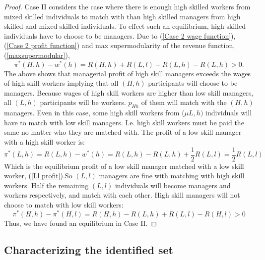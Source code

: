 \documentclass[12 pt]{article}
\begin{document}
\begin{proof}
	Case II considers the case where there is enough high skilled workers from
	mixed skilled individuals to match with than high skilled managers from high
	skilled and mixed skilled individuals. To effect such an equilibrium, high
	skilled individuals have to choose to be managers. Due to
	(\ref{Case 2 wage function}), (\ref{Case 2 profit function}) and max
	supermodularity of the revenue function, (\ref{maxsupermodular}),
	\[
	\pi^{\ast}(H,h)-w^{\ast}(h)=R(H,h)+R(L,l)-R(L,h)-R(L,h)>0.
	\]
	The above shows that managerial profit of high skill managers exceeds the
	wages of high skill workers implying that all $(H,h)$ participants will choose
	to be managers.	Because wages of high skill workers are higher than low skill managers, all $(L,h)$ participants will be workers. $p_{Hh}$ of them will match with the $(H,h)$ managers. Even in this case, some
	high skill workers from ($\mu L,h)$ individuals will have to match with low
	skill managers. I.e. high skill workers must be paid the same no matter who
	they are matched with. The profit of a low skill manager with a high skill
	worker is:%
	\begin{equation}
		\pi^{\ast}(L,h)=R(L,h)-w^{\ast}(h)=R(L,h)-R(L,h)+\frac{1}{2}R(L,l)=\frac{1}%
		{2}R(L,l)\label{Lh profits}%
	\end{equation}
	Which is the equilibrium profit of a low skill manager matched with a low skill worker, (\ref{Ll profit}).So $(L,l)$ managers are fine with matching with high skill workers. Half the remaining $(L,l)$ individuals will become managers and workers respectively, and match with each other. High skill managers will not choose to match with low skill workers:%
	\[
	\pi^{\ast}(H,h)-\pi^{\ast}(H,l)=R(H,h)-R(L,h)+R(L,l)-R(H,l)>0
	\]
	Thus, we have found an equilibrium in Case II.
\end{proof}

\subsection{Characterizing the identified set}
	
	
%	
%	
	
\end{document}
